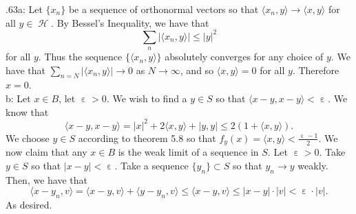 \documentclass[letterpaper]{article}
\DeclareMathOperator{\hil}{\mathcal{H}}
\DeclareMathOperator{\ep}{\varepsilon}
\newcommand{\lan}{\langle}
\newcommand{\ran}{\rangle}
\newcommand{\inn}[1]{\lan#1\ran}
\begin{document}
 .63a: Let $\{x_n\}$ be a sequence of orthonormal vectors so that $\inn{x_n, y} \to \inn{x,y}$ for all $y\in \hil$.  
By Bessel's Inequality, we have that $$\sum_n |\inn{x_n, y}| \leq |y|^2$$ for all $y$. Thus the sequence $\{\inn{x_n,y}\}$ absolutely converges for any
choice of $y$. We have that $\sum_{n=N} |\inn{x_n,y}| \to 0$ as $N \to \infty$, and so $\inn{x,y} = 0$ for all $y$. Therefore $x=0$. 
\newline \\ b: Let $x\in B$, let $\ep>0$. We wish to find a $y\in S$ so that $\inn{x-y,x-y}< \ep$. We know that 
$$\inn{x-y,x-y} = |x|^2 + 2\inn{x,y} + |y,y| \leq 2(1+\inn{x,y}).$$ 
We choose $y\in S$ according to theorem 5.8 so that $f_y(x) = \inn{x,y} < \frac{\ep - 1}{2}$. 
We now claim that any $x\in B$ is the weak limit of a sequence in $S$. Let $\ep >0$. Take $y \in S$ so that $|x-y|< \ep$. Take a sequence $\{y_n\}\subset S$ so that $y_n \to y$ weakly. 
Then, we have that $$\inn{x-y_n, v} = \inn{x-y,v} + \inn{y-y_n, v}\leq \inn{x-y,v} \leq |x-y|\cdot |v|< \ep \cdot |v|.$$
As desired. 
\end{document}
